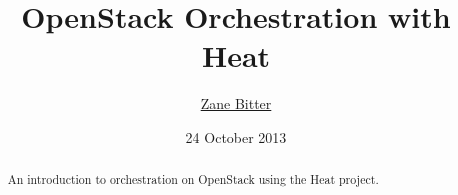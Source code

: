 \documentclass{tufte-handout}
\title{OpenStack Orchestration with Heat}
\author{\href{mailto:zbitter@redhat.com}{Zane Bitter}}
\date{24 October 2013}
\begin{document}
\maketitle

\marginnote{\tableofcontents \vspace{2em}}

\begin{abstract}
An introduction to orchestration on OpenStack using the Heat project.
\end{abstract}








\end{document}
